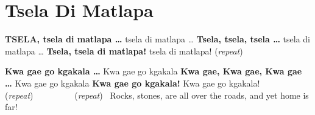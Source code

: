 \starttocol
\chapter{Tsela Di Matlapa}
\nexttocol
\hfill{\it }
\stoptocol
\starttocol
\startlines
{\sc }
{\bf T{\small\bf SELA}, tsela di matlapa \dots}
 \hfill  tsela di matlapa \dots
{\bf Tsela, tsela, tsela \dots}
 \hfill  tsela di matlapa \dots
{\bf Tsela, tsela di matlapa!}
 \hfill  tsela di matlapa!
         \hfill({\it repeat})~~~~~~~~~

{\bf Kwa gae go kgakala \dots}
 \hfill  Kwa gae go kgakala
{\bf Kwa gae, Kwa gae, Kwa gae \dots}
 \hfill  Kwa gae go kgakala
{\bf Kwa gae go kgakala!}
 \hfill  Kwa gae go kgakala!
         \hfill({\it repeat})~~~~~~~~~
         \hfill({\it repeat})~
\stoplines
\nexttocol
Rocks, stones, are all over the roads, and yet home is far!
\stoptocol
